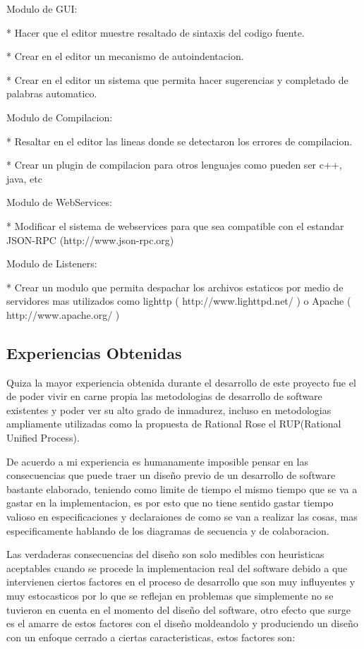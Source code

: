 Modulo de GUI:

* Hacer que el editor muestre resaltado de sintaxis del codigo fuente.

* Crear en el editor un mecanismo de autoindentacion.

* Crear en el editor un sistema que permita hacer sugerencias y completado de palabras automatico.

Modulo de Compilacion:

* Resaltar en el editor las lineas donde se detectaron los errores de compilacion.

* Crear un plugin de compilacion para otros lenguajes como pueden ser c++, java, etc

Modulo de WebServices:

* Modificar el sistema de webservices para que sea compatible con el estandar JSON-RPC (http://www.json-rpc.org)

Modulo de Listeners:

* Crear un modulo que permita despachar los archivos estaticos por medio de servidores mas utilizados como lighttp ( http://www.lighttpd.net/ ) o Apache ( http://www.apache.org/ )


\subsection{Experiencias Obtenidas}


Quiza la mayor experiencia obtenida durante el desarrollo de este proyecto fue el de poder vivir en carne propia las metodologias de desarrollo de software existentes y poder ver su alto grado de inmadurez, incluso en metodologias ampliamente utilizadas como la propuesta de Rational Rose el RUP(Rational Unified Process).

De acuerdo a mi experiencia es humanamente imposible pensar en las consecuencias que puede traer un diseño previo de un desarrollo de software bastante elaborado, teniendo como limite de tiempo el mismo tiempo que se va a gastar en la implementacion, es por esto que no tiene sentido gastar tiempo valioso en especificaciones y declaraiones de como se van a realizar las cosas, mas especificamente hablando de los diagramas de secuencia y de colaboracion.

Las verdaderas consecuencias del diseño son solo medibles con heuristicas aceptables cuando se procede la implementacion real del software debido a que intervienen ciertos factores en el proceso de desarrollo que son muy influyentes y muy estocasticos por lo que se reflejan en problemas que simplemente no se tuvieron en cuenta en el momento del diseño del software, otro efecto que surge es el amarre de estos factores con el diseño moldeandolo y produciendo un diseño con un enfoque cerrado a ciertas caracteristicas, estos factores son:

